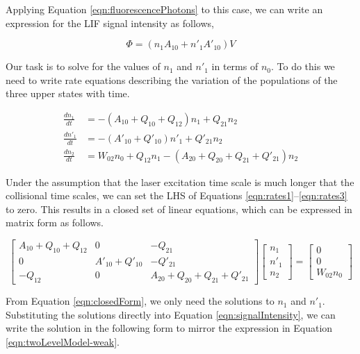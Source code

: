 Applying Equation \ref{eqn:fluorescencePhotons} to this case, we can write an expression for the LIF signal intensity as follows,

\begin{equation}
  \Phi = ( n_1 A_{10} + n'_1 A'_{10} )V
  \label{eqn:signalIntensity}
\end{equation}

Our task is to solve for the values of \(n_1\) and \(n'_1\) in terms of \(n_0\).
To do this we need to write rate equations describing the variation of the populations of the three upper states with time.

\begin{align}
  \frac{dn_1}{dt} &= -( A_{10} + Q_{10} + Q_{12} )n_1 + Q_{21} n_2
  \label{eqn:rates1}\\
  \frac{dn'_1}{dt} &= -( A'_{10} + Q'_{10} )n'_1 + Q'_{21} n_2
  \label{eqn:rates2}\\
  \frac{dn_2}{dt} &= W_{02} n_0 + Q_{12} n_1 - ( A_{20} + Q_{20} + Q_{21} + Q'_{21} )n_2
  \label{eqn:rates3}
\end{align}

Under the assumption that the laser excitation time scale is much longer that the collisional time scales, we can set the LHS of Equations \ref{eqn:rates1}--\ref{eqn:rates3} to zero.
This results in a closed set of linear equations, which can be expressed in matrix form as follows.

\begin{equation}
  \left[
    \begin{matrix}
      A_{10} + Q_{10} + Q_{12} & 0 & -Q_{21}\\
      0 & A'_{10} + Q'_{10} & -Q'_{21}\\
      -Q_{12} & 0 & A_{20} + Q_{20} + Q_{21} + Q'_{21}
    \end{matrix}
  \right]\left[
    \begin{matrix}
      n_1\\
      n'_1\\
      n_2
    \end{matrix}
  \right] = \left[
    \begin{matrix}
      0\\
      0\\
      W_{02}n_0
    \end{matrix}
  \right]
  \label{eqn:closedForm}
\end{equation}

From Equation \ref{eqn:closedForm}, we only need the solutions to \(n_1\) and \(n'_1\).
Substituting the solutions directly into Equation \ref{eqn:signalIntensity}, we can write the solution in the following form to mirror the expression in Equation \ref{eqn:twoLevelModel-weak}.

